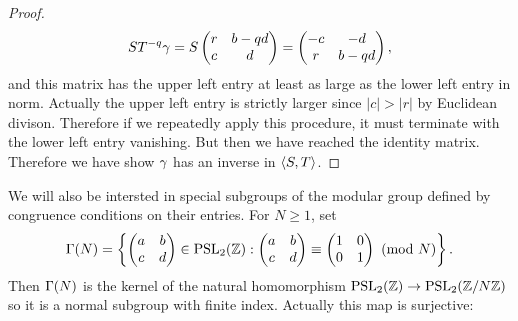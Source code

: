 \begin{proof}
        \[
          ST^{-q}\gamma = S\begin{pmatrix} r & b-qd \\ c & d \end{pmatrix} = \begin{pmatrix} -c & -d \\ r & b-qd \end{pmatrix},
        \]
        and this matrix has the upper left entry at least as large as the lower left entry in norm. Actually the upper left entry is strictly larger since $|c| > |r|$ by Euclidean divison. Therefore if we repeatedly apply this procedure, it must terminate with the lower left entry vanishing. But then we have reached the identity matrix. Therefore we have show $\gamma$ has an inverse in $\langle S,T\rangle$.
      \end{proof}

      We will also be intersted in special subgroups of the modular group defined by congruence conditions on their entries. For $N \ge 1$, set
      \[
        \Gamma(N) = \left\{\begin{pmatrix} a & b \\ c & d \end{pmatrix} \in \mathrm{PSL}_{2}(\mathbb{Z}):\begin{pmatrix} a & b \\ c & d \end{pmatrix} \equiv \begin{pmatrix} 1 & 0 \\ 0 & 1 \end{pmatrix} \ \left(\text{mod }N\right)\right\}.
      \]
      Then $\Gamma(N)$ is the kernel of the natural homomorphism $\mathrm{PSL}_{2}(\mathbb{Z}) \to \mathrm{PSL}_{2}(\mathbb{Z}/N\mathbb{Z})$ so it is a normal subgroup with finite index. Actually this map is surjective:


